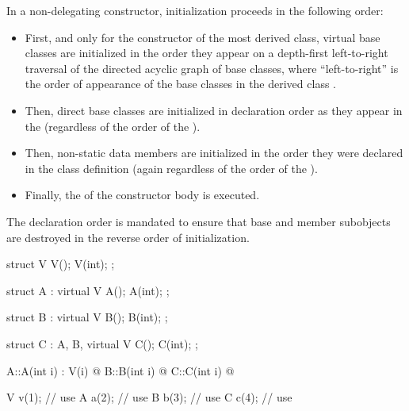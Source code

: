 \pnum
In a non-delegating constructor, initialization
proceeds in the following order:
\begin{itemize}
\item
{}%
First, and only for the constructor of the most derived class,
virtual base classes are initialized in the order they appear on a
depth-first left-to-right traversal of the directed acyclic graph of
base classes,
where ``left-to-right'' is the order of appearance of the base classes
in the derived class
.
\item
{}%
Then, direct base classes are initialized in declaration order
as they appear in the
(regardless of the order of the
).
\item
{}%
Then, non-static data members are initialized in the order
they were declared in the class definition
(again regardless of the order of the
).
\item
Finally, the  of the constructor
body  is executed.
\end{itemize}

\begin{note}
The declaration order is mandated to ensure that base and member
subobjects are destroyed in the reverse order of initialization.
\end{note}

\pnum
\begin{example}
\begin{codeblock}
struct V {
  V();
  V(int);
};

struct A : virtual V {
  A();
  A(int);
};

struct B : virtual V {
  B();
  B(int);
};

struct C : A, B, virtual V {
  C();
  C(int);
};

A::A(int i) : V(i) { @\commentellip@ }
B::B(int i) { @\commentellip@ }
C::C(int i) { @\commentellip@ }

V v(1);             // use 
A a(2);             // use 
B b(3);             // use 
C c(4);             // use 
\end{codeblock}
\end{example}

